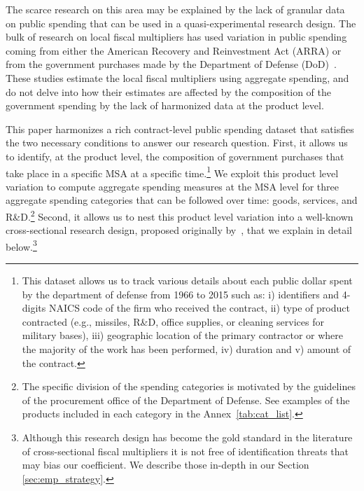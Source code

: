 \documentclass[dv_diss_main.tex]{subfiles}
\begin{document}
The scarce research on this area may be explained by the lack of granular data on public spending that can be used in a quasi-experimental research design. The bulk of research on local fiscal multipliers has used variation in public spending coming from either the American Recovery and Reinvestment Act (ARRA) \citep{chodorow2012does,wilson2012fiscal,conley2013american,dupor20162009} or from the government purchases made by the Department of Defense (DoD)~\citep{Nakamura2014,dupor2017local,Demyanyk2019,Auerbach2020}. These studies estimate the local fiscal multipliers using aggregate spending, and do not delve into how their estimates are affected by the composition of the government spending by the lack of harmonized data at the product level. 

This paper harmonizes a rich contract-level public spending dataset that satisfies the two necessary conditions to answer our research question. First, it allows us to identify, at the product level, the composition of government purchases that take place in a specific MSA at a specific time.\footnote{This dataset allows us to track various details about each public dollar spent by the department of defense from 1966 to 2015 such as: i) identifiers and 4-digits NAICS code of the firm who received the contract, ii) type of product contracted (e.g., missiles, R\&D, office supplies, or cleaning services for military bases), iii) geographic location of the primary contractor or where the majority of the work has been performed, iv) duration and v) amount of the contract.}
We exploit this product level variation to compute aggregate spending measures at the MSA level for three aggregate spending categories that can be followed over time: goods, services, and R\&D.\footnote{The specific division of the spending categories is motivated by the guidelines of the procurement office of the Department of Defense. See examples of the products included in each category in the Annex~\ref{tab:cat_list}.} Second, it allows us to nest this product level variation into a well-known cross-sectional research design, proposed originally by~\cite{Nakamura2014}, that we explain in detail below.\footnote{Although this research design has become the gold standard in the literature of cross-sectional fiscal multipliers \citep{Auerbach2019, Demyanyk2019,basso2021young,dupor2017local, Juarros2021} it is not free of identification threats that may bias our coefficient. We describe those in-depth in our Section \ref{sec:emp_strategy}.}
\end{document}
